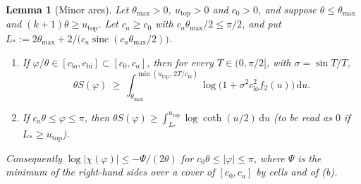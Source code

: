 \documentclass[11pt]{amsart}
\newtheorem{lemma}[theorem]{Lemma}
\theoremstyle{definition}
\theoremstyle{remark}
\numberwithin{equation}{section}
\newcommand{\sinc}{\operatorname{sinc}}
\newcommand{\dd}{\,\mathrm{d}}
\begin{document}
\begin{lemma}[Minor arcs]\label{lem:minor}
Let $\theta_{\max}>0$, $u_{\mathrm{top}}>0$ and $c_0>0$, and suppose $\theta\le\theta_{\max}$ and $(k+1)\theta\ge u_{\mathrm{top}}$.
Let $c_a\ge c_0$ with $c_a\theta_{\max}/2\le\pi/2$, and put $L_\ast:=2\theta_{\max}+2/\bigl(c_a\sinc(c_a\theta_{\max}/2)\bigr)$.
\begin{enumerate}[label=(\alph*)]
\item If $\varphi/\theta\in[c_{\mathrm{lo}},c_{\mathrm{hi}}]\subset[c_0,c_a]$, then for every $T\in(0,\pi/2]$, with $\sigma=\sin T/T$,
\[
  \theta S(\varphi)\ \ge\ \int_{\theta_{\max}}^{\min(u_{\mathrm{top}},\,2T/c_{\mathrm{hi}})}\log\bigl(1+\sigma^2c_{\mathrm{lo}}^2f_2(u)\bigr)\dd u .
\]
\item If $c_a\theta\le\varphi\le\pi$, then $\theta S(\varphi)\ge\int_{L_\ast}^{u_{\mathrm{top}}}\log\coth(u/2)\dd u$ (to be read as $0$ if $L_\ast\ge u_{\mathrm{top}}$).
\end{enumerate}
Consequently $\log|\chi(\varphi)|\le-\Psi/(2\theta)$ for $c_0\theta\le|\varphi|\le\pi$, where $\Psi$ is the minimum of the right-hand
sides over a cover of $[c_0,c_a]$ by cells and of (b).
\end{lemma}
\end{document}
